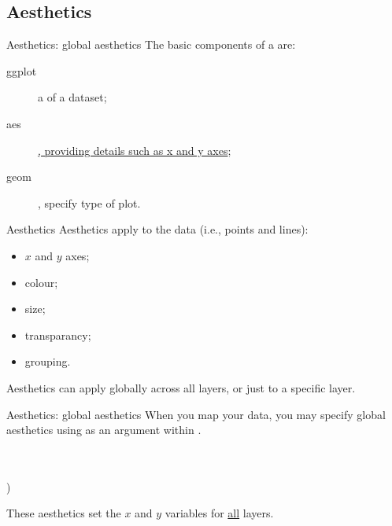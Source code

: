 \documentclass{beamer}
\begin{document}
\subsection{Aesthetics}
\begin{frame}{Aesthetics: global aesthetics}
The basic components of a  are:
\begin{description}
\item[ggplot]  a  of a dataset;
\item [aes] \underline{, providing details such as x and y axes};
\item [geom] , specify type of plot.
\end{description}
\end{frame}

\begin{frame}{Aesthetics}
Aesthetics apply to the data (i.e., points and lines):
\begin{itemize}
\item $x$ and $y$ axes;
\item colour;
\item size;
\item transparancy;
\item grouping.
\end{itemize}

Aesthetics can apply globally across all layers, or just to a specific layer.
\end{frame}

\begin{frame}{Aesthetics: global aesthetics}
When you map your data, you may specify global aesthetics using  as an argument within .

\pause

\begin{example}
 \pipe {} \\
\\
) 
\end{example}

\bigskip 
These aesthetics set the $x$ and $y$ variables for \underline{all} layers. 

\end{frame}
\end{document}
